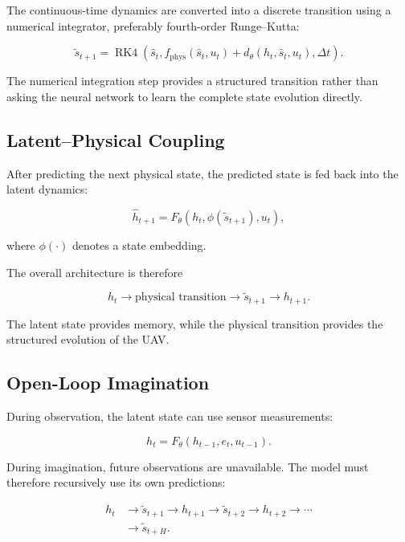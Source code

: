 \documentclass[conference]{IEEEtran}
\begin{document}
The continuous-time dynamics are converted into a discrete transition
using a numerical integrator, preferably fourth-order Runge--Kutta:

\begin{equation}
\tilde{s}_{t+1}
=
\operatorname{RK4}
\left(
\hat{s}_t,
f_{\mathrm{phys}}(\hat{s}_t,u_t)
+
d_{\theta}(h_t,\hat{s}_t,u_t),
\Delta t
\right).
\end{equation}

The numerical integration step provides a structured transition rather
than asking the neural network to learn the complete state evolution
directly.


\subsection{Latent--Physical Coupling}

After predicting the next physical state, the predicted state is fed
back into the latent dynamics:

\begin{equation}
\boxed{
\hat{h}_{t+1}
=
F_{\theta}
\left(
h_t,
\phi(\tilde{s}_{t+1}),
u_t
\right),
}
\end{equation}

where $\phi(\cdot)$ denotes a state embedding.

The overall architecture is therefore

\begin{equation}
\boxed{
h_t
\rightarrow
\text{physical transition}
\rightarrow
\tilde{s}_{t+1}
\rightarrow
h_{t+1}.
}
\end{equation}

The latent state provides memory, while the physical transition
provides the structured evolution of the UAV.


\subsection{Open-Loop Imagination}

During observation, the latent state can use sensor measurements:

\begin{equation}
h_t =
F_{\theta}
(h_{t-1},e_t,u_{t-1}).
\end{equation}

During imagination, future observations are unavailable. The model must
therefore recursively use its own predictions:

\begin{align}
h_t
&\rightarrow
\tilde{s}_{t+1}
\rightarrow
h_{t+1}
\rightarrow
\tilde{s}_{t+2}
\rightarrow
h_{t+2}
\rightarrow
\cdots \\
&\rightarrow
\tilde{s}_{t+H}.
\end{align}
\end{document}
